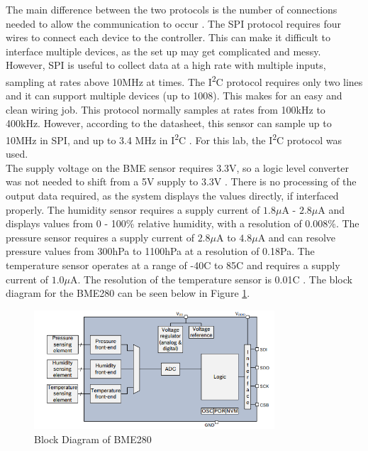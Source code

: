\documentclass[11pt]{article}
\begin{document}
The main difference between the two protocols is the number of connections needed to allow the communication to occur \cite{I2C}. The SPI protocol requires four wires to connect each device to the controller. This can make it difficult to interface multiple devices, as the set up may get complicated and messy. However, SPI is useful to collect data at a high rate with multiple inputs, sampling at rates above 10MHz at times. The I\textsuperscript{2}C protocol requires only two lines and it can support multiple devices (up to 1008). This makes for an easy and clean wiring job. This protocol normally samples at rates from 100kHz to 400kHz. However, according to the datasheet, this sensor can sample up to 10MHz in SPI, and up to 3.4 MHz in I\textsuperscript{2}C \cite{BME}. For this lab, the I\textsuperscript{2}C protocol was used. \\
	
The supply voltage on the BME sensor requires 3.3V, so a logic level converter was not needed to shift from a 5V supply to 3.3V \cite{BME}. There is no processing of the output data required, as the system displays the values directly, if interfaced properly. The humidity sensor requires a supply current of $1.8\mu$A - $2.8\mu$A and displays values from 0 - 100\% relative humidity, with a resolution of 0.008\%. The pressure sensor requires a supply current of $2.8\mu$A to $4.8\mu$A and can resolve pressure values from 300hPa to 1100hPa at a resolution of 0.18Pa. The temperature sensor operates at a range of -40\textdegree C to 85\textdegree C and requires a supply current of $1.0\mu$A. The resolution of the temperature sensor is 0.01\textdegree C \cite{BME}. The block diagram for the BME280 can be seen below in Figure \ref{fig:block}.\\

\begin{figure}[ht]
    \centering
    \includegraphics[width=0.8\textwidth]{pics/block.PNG}
    \caption{Block Diagram of BME280}
    \label{fig:block}
\end{figure}
\end{document}
